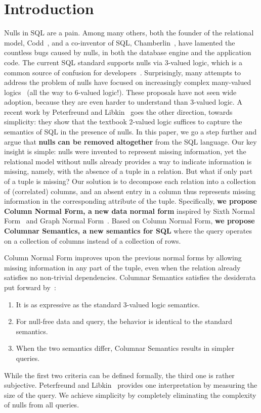 \documentclass[sigconf]{acmart}
\begin{document}
\section{Introduction}
Nulls in SQL are a pain.
Among many others,
 both the founder of the relational model, Codd~\cite{DBLP:books/aw/Codd90},
 and a co-inventor of SQL, Chamberlin~\cite{DBLP:conf/sigmod/Chamberlin23},
 have lamented the countless bugs caused by nulls,
 in both the database engine and the application code.
The current SQL standard supports nulls via 3-valued logic,
 which is a common source of confusion for developers~\cite{10.1145/3596673.3603142}.
Surprisingly, many attempts to address the problem of nulls
 have focused on increasingly complex many-valued logics~\cite{
  DBLP:conf/kr/ConsoleGL16,
  DBLP:journals/sigmod/Date08,
  DBLP:journals/sigmod/Gessert90,
  DBLP:conf/future/JiaFM92,
  10.1145/126482.126487} (all the way to 6-valued logic!).
These proposals have not seen wide adoption,
 because they are even harder to understand than 3-valued logic.
A recent work by Peterfreund and Libkin~\cite{DBLP:conf/pods/LibkinP23}
 goes the other direction, towards simplicity:
 they show that the textbook 2-valued logic suffices to capture 
 the semantics of SQL in the presence of nulls.
In this paper, we go a step further and argue that \textbf{nulls can be removed altogether}
 from the SQL language.
Our key insight is simple: nulls were invented to represent missing information,
 yet the relational model without nulls already provides a way to indicate information
 is missing, namely, with the absence of a tuple in a relation.
But what if only part of a tuple is missing?
Our solution is to decompose each relation into a collection of (correlated) columns,
 and an absent entry in a column thus represents missing information
 in the corresponding attribute of the tuple.
Specifically, \textbf{we propose Column Normal Form, 
 a new data normal form} inspired by Sixth Normal Form~\cite{DBLP:books/daglib/0014409} 
 and Graph Normal Form~\cite{RAIDocumentation}.
Based on Column Normal Form,
\textbf{we propose Columnar Semantics, a new semantics for SQL}
 where the query operates on a collection of columns instead of a collection of rows.

Column Normal Form improves upon the previous normal forms by allowing missing 
 information in any part of the tuple,
 even when the relation already satisfies no non-trivial dependencies.
Columnar Semantics satisfies the desiderata put forward by~\cite{DBLP:conf/pods/LibkinP23}:
 \begin{enumerate}
  \item It is as expressive as the standard 3-valued logic semantics.
  \item For null-free data and query, the behavior is identical to the standard semantics.
  \item When the two semantics differ, Columnar Semantics results in simpler queries.
 \end{enumerate}
While the first two criteria can be defined formally,
 the third one is rather subjective.
Peterfreund and Libkin~\cite{DBLP:conf/pods/LibkinP23} provides one interpretation 
 by measuring the size of the query.
We achieve simplicity by completely eliminating the complexity of nulls from all queries. 
\end{document}
